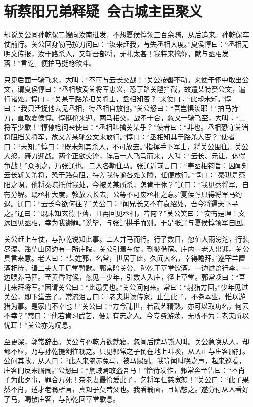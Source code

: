 \chapter{斩蔡阳兄弟释疑~会古城主臣聚义}

却说关公同孙乾保二嫂向汝南进发，不想夏侯惇领三百余骑，从后追来。孙乾保车仗前行。关公回身勒马按刀问曰：“汝来赶我，有失丞相大度。”夏侯惇曰：“丞相无明文传报，汝于路杀人，又斩吾部将，无礼太甚！我特来擒你，献与丞相发落！”言讫，便拍马挺枪欲斗。

只见后面一骑飞来，大叫：“不可与云长交战！”关公按辔不动。来使于怀中取出公文，谓夏侯惇曰：“丞相敬爱关将军忠义，恐于路关隘拦截，故遣某特赍公文，遍行诸处。”惇曰：“关某于路杀把关将士，丞相知否？”来使曰：“此却未知。”惇曰：“我只活捉他去见丞相，待丞相自放他。”关公怒曰：“吾岂惧汝耶！”拍马持刀，直取夏侯惇。惇挺枪来迎。两马相交，战不十合，忽又一骑飞至，大叫：“二将军少歇！”惇停枪问来使曰：“丞相叫擒关某乎？”使者曰：“非也。丞相恐守关诸将阻挡关将军，故又差某驰公文来放行。”惇曰：“丞相知其于路杀人否？”使者曰：“未知。”惇曰：“既未知其杀人，不可放去。”指挥手下军士，将关公围住。关公大怒，舞刀迎战。两个正欲交锋，阵后一人飞马而来，大叫：“云长、元让，休得争战！”众视之，乃张辽也。二人各勒住马。张辽近前言曰：“奉丞相钧旨：因闻知云长斩关杀将，恐于路有阻，特差我传谕各处关隘，任便放行。”惇曰：“秦琪是蔡阳之甥。他将秦琪托付我处，今被关某所杀，怎肯干休？”辽曰：“我见蔡将军，自有分解。既丞相大度，教放云长去，公等不可废丞相之意。”夏侯惇只得将军马约退。辽曰：“云长今欲何往？”关公曰：“闻兄长又不在袁绍处，吾今将遍天下寻之。”辽曰：“既未知玄德下落，且再回见丞相，若何？”关公笑曰：“安有是理！文远回见丞相，幸为我谢罪。”说毕，与张辽拱手而别。于是张辽与夏侯惇领军自回。

关公赶上车仗，与孙乾说知此事。二人并马而行。行了数日，忽值大雨滂沱，行装尽湿。遥望山冈边有一所庄院，关公引着车仗，到彼借宿。庄内一老人出迎。关公具言来意。老人曰：“某姓郭，名常，世居于此。久闻大名，幸得瞻拜。”遂宰羊置酒相待，请二夫人于后堂暂歇。郭常陪关公、孙乾于草堂饮酒。一边烘焙行李，一边喂养马匹。至黄昏时候，忽见一少年，引数人入庄，径上草堂。郭常唤曰：“吾儿来拜将军。”因谓关公曰：“此愚男也。”关公问何来。常曰：“射猎方回。”少年见过关公，即下堂去了。常流泪言曰：“老夫耕读传家，止生此子，不务本业，惟以游猎为事。是家门不幸也！”关公曰：“方今乱世，若武艺精熟，亦可以取功名，何云不幸？”常曰：“他若肯习武艺，便是有志之人。今专务游荡，无所不为：老夫所以忧耳！”关公亦为叹息。

至更深，郭常辞出。关公与孙乾方欲就寝，忽闻后院马嘶人叫。关公急唤从人，却都不应，乃与孙乾提剑往视之。只见郭常之子倒在地上叫唤，从人正与庄客厮打。公问其故。从人曰：“此人来盗赤兔马，被马踢倒。我等闻叫唤之声，起来巡看，庄客们反来厮闹。”公怒曰：“鼠贼焉敢盗吾马！”恰待发作，郭常奔至告曰：“不肖子为此歹事，罪合万死！奈老妻最怜爱此子，乞将军仁慈宽恕！”关公曰：“此子果然不肖，适才老翁所言，真知子莫若父也。我看翁面，且姑恕之。”遂分付从人看好了马，喝散庄客，与孙乾回草堂歇息。

